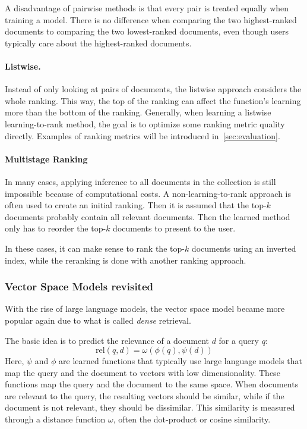 A disadvantage of pairwise methods is that every pair is treated equally when training a model. There is no difference when comparing the two highest-ranked documents to comparing the two lowest-ranked documents, even though users typically care about the highest-ranked documents. 

\paragraph{Listwise.} Instead of only looking at pairs of documents, the listwise approach considers the whole ranking. This way, the top of the ranking can affect the function's learning more than the bottom of the ranking.
Generally, when learning a listwise learning-to-rank method, the goal is to optimize some ranking metric quality directly. Examples of ranking metrics will be introduced in~\cref{sec:evaluation}.

\paragraph{Multistage Ranking}
\label{sec:multistage}
In many cases, applying inference to all documents in the collection is still impossible because of computational costs. A non-learning-to-rank approach is often used to create an initial ranking. Then it is assumed that the top-$k$ documents probably contain all relevant documents. Then the learned method only has to reorder the top-$k$ documents to present to the user. 

In these cases, it can make sense to rank the top-$k$ documents using an inverted index, while the reranking is done with another ranking approach.

\subsubsection{Vector Space Models revisited}
With the rise of large language models, the vector space model became more popular again due to what is called \emph{dense} retrieval.  

The basic idea is to predict the relevance of a document $d$ for a query $q$:
\begin{equation}
	\text{rel}(q, d) = \omega\left(\phi\left(q\right),
	\psi\left(d\right)\right)
\end{equation}
Here, $\psi$ and $\phi$ are learned functions that typically use large language models that map the query and the document to vectors with low dimensionality. These functions map the query and the document to the same space. When documents are relevant to the query, the resulting vectors should be similar, while if the document is not relevant, they should be dissimilar. This similarity is measured through a distance function $\omega$, often the dot-product or cosine similarity.

